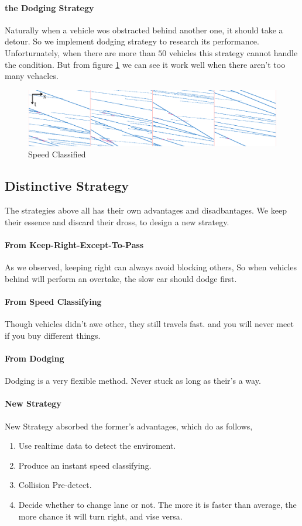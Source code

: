 \paragraph{the Dodging Strategy}
Naturally when a vehicle wos obstracted behind another one, it should take a detour. So we implement dodging strategy to research its performance. Unforturnately, when there are more than $50$ vehicles this strategy cannot handle the condition. But from figure \ref{fig:dodging} we can see it work well when there aren't too many vehacles. 
\begin{figure}[H]
  \centering
  \includegraphics[width=.8\textwidth]{./img/dodging.png}
  \caption{Speed Classified}
  \label{fig:dodging}
\end{figure}
\subsection{Distinctive Strategy}
The strategies above all has their own advantages and disadbantages. We keep their essence and discard their dross, to design a new strategy. 
\paragraph{From Keep-Right-Except-To-Pass}
As we observed, keeping right can always avoid blocking others, So when vehicles behind will perform an overtake, the slow car should dodge first. 
\paragraph{From Speed Classifying}
Though vehicles didn't awe other, they still travels fast. and you will never meet if you buy different things. 
\paragraph{From Dodging}
Dodging is a very flexible method. Never stuck as long as their's a way. 
\paragraph{New Strategy}
New Strategy absorbed the former's advantages, which do as follows, 
\begin{enumerate}
\item Use realtime data to detect the enviroment. 
\item Produce an instant speed classifying. 
\item Collision Pre-detect. 
\item Decide whether to change lane or not. The more it is faster than average, the more chance it will turn right, and vise versa. 
\end{enumerate}
